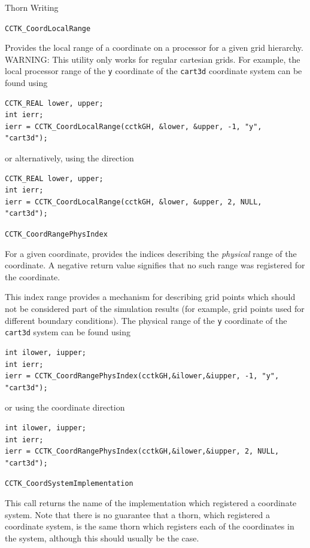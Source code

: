 \begin{cactuspart}{Thorn Writing}
\begin{Lentry}
\item[\texttt{CCTK\_CoordLocalRange}]

Provides the local range of a coordinate on a processor for a given
grid hierarchy. WARNING: This utility only works for regular
cartesian grids. For example, the local processor range of the
\texttt{y} coordinate of the \texttt{cart3d} coordinate system can be found using
%
\begin{verbatim}
CCTK_REAL lower, upper;
int ierr;
ierr = CCTK_CoordLocalRange(cctkGH, &lower, &upper, -1, "y", "cart3d");
\end{verbatim}
or alternatively, using the direction
%
\begin{verbatim}
CCTK_REAL lower, upper;
int ierr;
ierr = CCTK_CoordLocalRange(cctkGH, &lower, &upper, 2, NULL, "cart3d");
\end{verbatim}

\item[\texttt{CCTK\_CoordRangePhysIndex}]

For a given coordinate, provides the indices describing the \emph{physical}
range of the coordinate. A negative return value signifies that no such range
was registered for the coordinate.

This index range provides a mechanism for describing
grid points which should not be considered part of the simulation results (for example,
grid points used for different boundary conditions). The physical range of the
\texttt{y} coordinate of the \texttt{cart3d} system can be found using

\begin{verbatim}
int ilower, iupper;
int ierr;
ierr = CCTK_CoordRangePhysIndex(cctkGH,&ilower,&iupper, -1, "y", "cart3d");
\end{verbatim}
or using the coordinate direction
\begin{verbatim}
int ilower, iupper;
int ierr;
ierr = CCTK_CoordRangePhysIndex(cctkGH,&ilower,&iupper, 2, NULL, "cart3d");
\end{verbatim}

\item[\texttt{CCTK\_CoordSystemImplementation}]

This call returns the name of the implementation which registered a coordinate system.
Note that there is no guarantee that a thorn, which registered a coordinate system, is
the same thorn which registers each of the coordinates in the system, although this
should usually be the case.

\end{Lentry}


\end{cactuspart}
